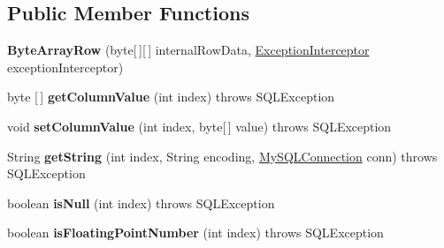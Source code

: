 \subsection*{Public Member Functions}
\begin{DoxyCompactItemize}
\item 
\mbox{\label{classcom_1_1mysql_1_1jdbc_1_1_byte_array_row_a88edb5f2a96be84eb481f2fb25af3139}} 
{\bfseries Byte\+Array\+Row} (byte\mbox{[}$\,$\mbox{]}\mbox{[}$\,$\mbox{]} internal\+Row\+Data, \mbox{\hyperlink{interfacecom_1_1mysql_1_1jdbc_1_1_exception_interceptor}{Exception\+Interceptor}} exception\+Interceptor)
\item 
\mbox{\label{classcom_1_1mysql_1_1jdbc_1_1_byte_array_row_abd26cafacb6d7082d9c5af313fa0c376}} 
byte \mbox{[}$\,$\mbox{]} {\bfseries get\+Column\+Value} (int index)  throws S\+Q\+L\+Exception 
\item 
\mbox{\label{classcom_1_1mysql_1_1jdbc_1_1_byte_array_row_aaf3ebe4d7a6bfb74054bbcc45b3d778b}} 
void {\bfseries set\+Column\+Value} (int index, byte\mbox{[}$\,$\mbox{]} value)  throws S\+Q\+L\+Exception 
\item 
\mbox{\label{classcom_1_1mysql_1_1jdbc_1_1_byte_array_row_a875610f0e5d5d2a441f836dbca4ca254}} 
String {\bfseries get\+String} (int index, String encoding, \mbox{\hyperlink{interfacecom_1_1mysql_1_1jdbc_1_1_my_s_q_l_connection}{My\+S\+Q\+L\+Connection}} conn)  throws S\+Q\+L\+Exception 
\item 
\mbox{\label{classcom_1_1mysql_1_1jdbc_1_1_byte_array_row_a394722b0e671f3dcb3c6a31b5898aeec}} 
boolean {\bfseries is\+Null} (int index)  throws S\+Q\+L\+Exception 
\item 
\mbox{\label{classcom_1_1mysql_1_1jdbc_1_1_byte_array_row_a59d92d5e217b474a2a82c49f02f27e0f}} 
boolean {\bfseries is\+Floating\+Point\+Number} (int index)  throws S\+Q\+L\+Exception 
\item 
\mbox{\label{classcom_1_1mysql_1_1jdbc_1_1_byte_array_row_ad1e7d229ebb073a47b554f5ad52d2549}} 

\end{DoxyCompactItemize}
